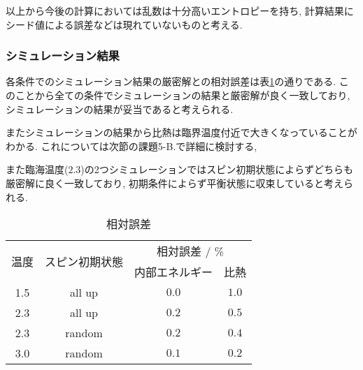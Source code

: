 以上から今後の計算においては乱数は十分高いエントロピーを持ち,
計算結果にシード値による誤差などは現れていないものと考える.
\subsubsection{シミュレーション結果}
各条件でのシミュレーション結果の厳密解との相対誤差は表\ref{tab:5a4}の通りである.
このことから全ての条件でシミュレーションの結果と厳密解が良く一致しており,
シミュレーションの結果が妥当であると考えられる.

またシミュレーションの結果から比熱は臨界温度付近で大きくなっていることがわかる.
これについては次節の課題5-B.で詳細に検討する,

また臨海温度($2.3$)の2つシミュレーションではスピン初期状態によらずどちらも厳密解に良く一致しており,
初期条件によらず平衡状態に収束していると考えられる.
\begin{table}[h]
\caption{相対誤差}
\label{tab:5a4}
\centering
\begin{tabular}{cc|cc}
\hline
\multirow{2}{*}{温度}&\multirow{2}{*}{スピン初期状態}&\multicolumn{2}{c}{相対誤差 / \%}\\
&&内部エネルギー&比熱\\
\hline \hline
1.5&all up&$0.0$&$1.0$\\
2.3&all up&$0.2$&$0.5$\\
2.3&random&$0.2$&$0.4$\\
3.0&random&$0.1$&$0.2$\\
\hline
\end{tabular}
\end{table}
